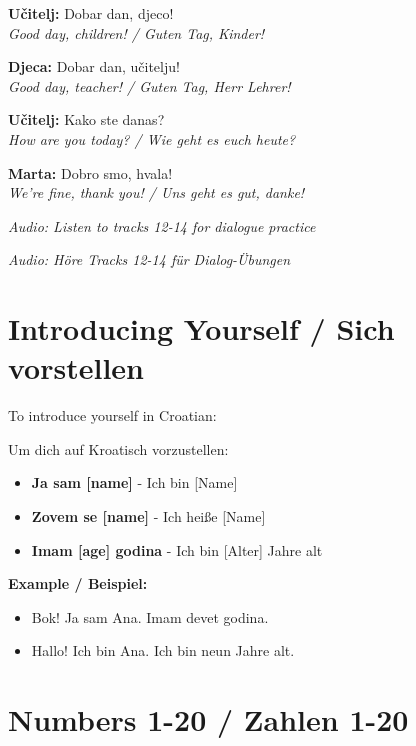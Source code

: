 \begin{culture}
\textbf{Učitelj:} Dobar dan, djeco! \\
\textit{Good day, children! / Guten Tag, Kinder!}

\textbf{Djeca:} Dobar dan, učitelju! \\
\textit{Good day, teacher! / Guten Tag, Herr Lehrer!}

\textbf{Učitelj:} Kako ste danas? \\
\textit{How are you today? / Wie geht es euch heute?}

\textbf{Marta:} Dobro smo, hvala! \\
\textit{We're fine, thank you! / Uns geht es gut, danke!}

\textit{Audio: Listen to tracks 12-14 for dialogue practice}

\textit{Audio: Höre Tracks 12-14 für Dialog-Übungen}
\end{culture}

\section{Introducing Yourself / Sich vorstellen}

\begin{grammar}
To introduce yourself in Croatian:

Um dich auf Kroatisch vorzustellen:

\begin{itemize}
    \item \textbf{Ja sam [name]} - Ich bin [Name]
    \item \textbf{Zovem se [name]} - Ich heiße [Name]
    \item \textbf{Imam [age] godina} - Ich bin [Alter] Jahre alt
\end{itemize}
\end{grammar}

\textbf{Example / Beispiel:}
\begin{itemize}
    \item Bok! Ja sam Ana. Imam devet godina.
    \item Hallo! Ich bin Ana. Ich bin neun Jahre alt.
\end{itemize}

\section{Numbers 1-20 / Zahlen 1-20}

